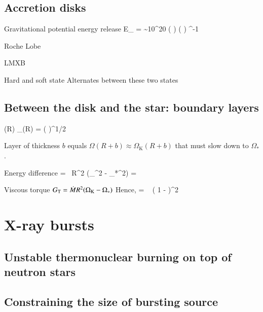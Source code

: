 \subsection{Accretion disks}

Gravitational potential energy release
\be
\Delta E_{} =  \sim 10^{20}  \left(  \right) \left(  \right) \unitspace\erg\unitspace\g^{-1}
\ee

Roche Lobe \cite{PRP02} \cite{LL15}

LMXB \cite{TH06}

Hard and soft state \cite{HvdK89}
Alternates between these two states \cite{MDF14} \cite{DGK07}



\subsection{Between the disk and the star: boundary layers}

\be
\Omega(R) \approx \Omega_{}(R) = \left(  \right)^{1/2}
\ee

Layer of thickness $b$ equals $\Omega(R + b) \approx \Omega_{\mathrm{K}}(R + b)$ that must slow down to $\Omega_{*}$.

Energy difference
\be
{} =  \Mdot R^2 (\Omega_{}^2 - \Omega_{*}^2) = 
 \Mdot {}  
\ee

Viscous torque $G_{\mathrm{T}} = \dot{M} R^2 (\Omega_{\mathrm{K}} - \Omega_*)$
Hence,
\be
{} =   \left( 1 -  \right)^2
\ee


\section{X-ray bursts}
\subsection{Unstable thermonuclear burning on top of neutron stars}

\subsection{Constraining the size of bursting source}




